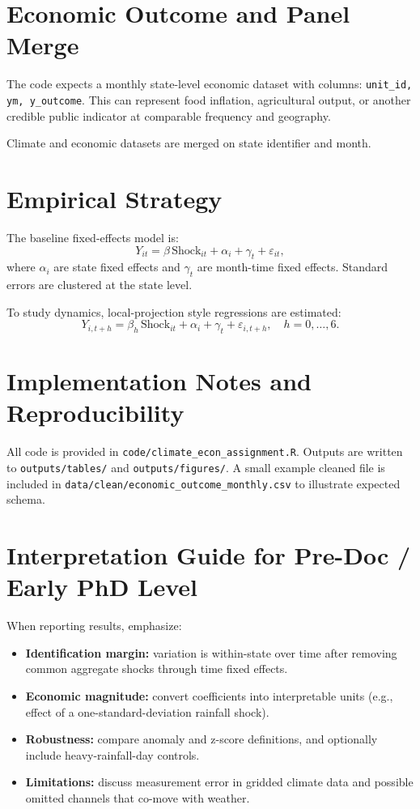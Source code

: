 \documentclass[11pt]{article}
\begin{document}
\section{Economic Outcome and Panel Merge}
The code expects a monthly state-level economic dataset with columns:
\texttt{unit\_id, ym, y\_outcome}. This can represent food inflation, agricultural output,
or another credible public indicator at comparable frequency and geography.

Climate and economic datasets are merged on state identifier and month.

\section{Empirical Strategy}
The baseline fixed-effects model is:
\begin{equation}
Y_{it} = \beta\,\text{Shock}_{it} + \alpha_i + \gamma_t + \varepsilon_{it},
\end{equation}
where $\alpha_i$ are state fixed effects and $\gamma_t$ are month-time fixed effects.
Standard errors are clustered at the state level.

To study dynamics, local-projection style regressions are estimated:
\begin{equation}
Y_{i,t+h} = \beta_h\,\text{Shock}_{it} + \alpha_i + \gamma_t + \varepsilon_{i,t+h},
\quad h=0,\dots,6.
\end{equation}

\section{Implementation Notes and Reproducibility}
All code is provided in \texttt{code/climate\_econ\_assignment.R}. Outputs are written to
\texttt{outputs/tables/} and \texttt{outputs/figures/}. A small example cleaned file is included in
\texttt{data/clean/economic\_outcome\_monthly.csv} to illustrate expected schema.

\section{Interpretation Guide for Pre-Doc / Early PhD Level}
When reporting results, emphasize:
\begin{itemize}
    \item \textbf{Identification margin:} variation is within-state over time after removing common
    aggregate shocks through time fixed effects.
    \item \textbf{Economic magnitude:} convert coefficients into interpretable units (e.g., effect of
    a one-standard-deviation rainfall shock).
    \item \textbf{Robustness:} compare anomaly and z-score definitions, and optionally include
    heavy-rainfall-day controls.
    \item \textbf{Limitations:} discuss measurement error in gridded climate data and possible
    omitted channels that co-move with weather.
\end{itemize}
\end{document}
